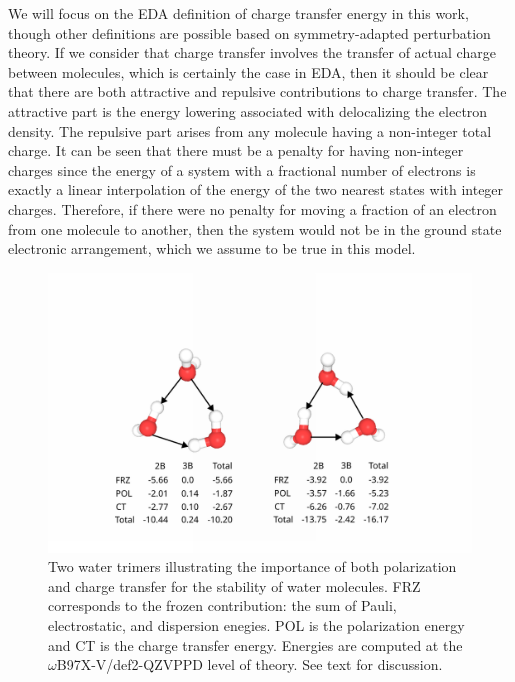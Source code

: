 \documentclass[journal=jacsat,manuscript=article]{achemso}
\begin{document}
We will focus on the EDA definition of charge transfer energy in this work, though
other definitions are possible based on symmetry-adapted perturbation theory.\cite{stone2009charge,misquitta2013charge}
If we consider that charge transfer involves the transfer of actual charge between
molecules, which is certainly the case in EDA\cite{thirman2018characterizing},
then it should be clear that there are both attractive and repulsive contributions
to charge transfer. The attractive part is the energy lowering associated with delocalizing
the electron density. The repulsive part arises from any molecule having a non-integer
total charge. It can be seen that there must be a penalty for having non-integer
charges since the energy of a system with a fractional number of electrons is exactly
a linear interpolation of the energy of the two nearest states with integer charges.\cite{perdew1982density}
Therefore, if there were no penalty for moving a fraction of an electron from one molecule to another,
then the system would not be in the ground state electronic arrangement, which we
assume to be true in this model.

\begin{figure}[H]
  \includegraphics*[width=\textwidth]{figures/trimer_mbe_example.png}
  \caption{Two water trimers illustrating the importance of both polarization
  and charge transfer for the stability of water molecules. FRZ corresponds to
  the frozen contribution: the sum of Pauli, electrostatic, and dispersion enegies. POL is the polarization
  energy and CT is the charge transfer energy. Energies are computed at the
  $\omega$B97X-V/def2-QZVPPD level of theory. See text for discussion.}
  \label{fig:trimer}
\end{figure}
\end{document}
